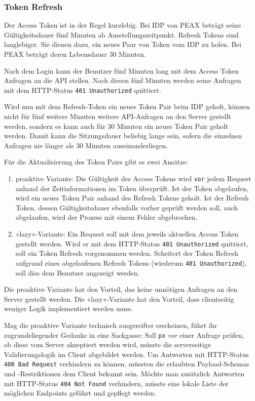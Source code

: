 \subsubsection{Token Refresh}

Der Access Token ist in der Regel kurzlebig. Bei IDP von PEAX beträgt seine Gültigkeitsdauer fünf Minuten ab Ausstellungszeitpunkt. Refresh Tokens sind langlebiger. Sie dienen dazu, ein neues Paar von Token vom IDP zu holen. Bei PEAX beträgt deren Lebensdauer 30 Minuten.

Nach dem Login kann der Benutzer fünf Minuten lang mit dem Access Token Anfragen an die API stellen. Nach diesen fünf Minuten werden seine Anfragen mit dem HTTP-Status \texttt{401 Unauthorized} quittiert.

Wird nun mit dem Refresh-Token ein neues Token Pair beim IDP geholt, können nicht für fünf weitere Minuten weitere API-Anfragen an den Server gestellt werden, sondern es kann auch für 30 Minuten ein neues Token Pair geholt werden. Damit kann die Sitzungsdauer beliebig lange sein, sofern die einzelnen Anfragen nie länger als 30 Minuten auseinanderliegen.

Für die Aktualisierung des Token Pairs gibt es zwei Ansätze:

\begin{enumerate}
    \item proaktive Variante: Die Gültigkeit des Access Tokens wird \texttt{vor} jedem Request anhand der Zeitinformationen im Token überprüft. Ist der Token abgelaufen, wird ein neues Token Pair anhand des Refresh Tokens geholt. Ist der Refresh Token, dessen Gültigkeitsdauer ebenfalls vorher geprüft werden soll,  auch abgelaufen, wird der Prozess mit einem Fehler abgebrochen.
    \item «lazy»-Variante: Ein Request soll mit dem jeweils aktuellen Access Token gestellt werden. Wird er mit dem HTTP-Status \texttt{401 Unauthorized} quittiert, soll ein Token Refresh vorgenommen werden. Scheitert der Token Refresh aufgrund eines abgelaufenen Refresh Tokens (wiederum \texttt{401 Unauthorized}), soll dies dem Benutzer angezeigt werden.
\end{enumerate}

Die proaktive Variante hat den Vorteil, das keine unnötigen Anfragen an den Server gestellt werden. Die «lazy»-Variante hat den Vorteil, dass clientseitig weniger Logik implementiert werden muss.

Mag die proaktive Variante technisch ausgereifter erscheinen, führt ihr zugrundeliegender Gedanke in eine Sackgasse: Soll \texttt{px} \textit{vor} einer Anfrage prüfen, ob diese vom Server akzeptiert werden wird, müsste die serverseitige Validierungslogik im Client abgebildet werden. Um Antworten mit HTTP-Status \texttt{400 Bad Request} verhindern zu können, müssten die erlaubten Payload-Schemas und -Restriktionen dem Client bekannt sein. Möchte man zusätzlich Antworten mit HTTP-Status \texttt{404 Not Found} verhindern, müsste eine lokale Liste der möglichen Endpoints geführt und gepflegt werden.

